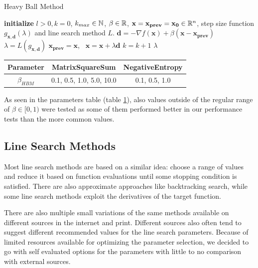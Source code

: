 \documentclass[a4paper,english,titlepage,12pt]{article}
\newcommand{\vect}[1]{\ensuremath{\mathbf{#1}}}
\newcommand{\norm}[1]{\ensuremath\Vert #1 \Vert}
\newcommand{\R}{\ensuremath\mathbb{R}}
\newcommand{\N}{\ensuremath\mathbb{N}}
\begin{document}
\begin{algorithm}[H]
\caption{Heavy Ball Method}
\label{alg_heavy_ball}
\begin{algorithmic}[1]
\STATE \textbf{initialize} $l > 0, k = 0$, $k_{max} \in \N$, $\beta \in \R$, $\vect{x} = \vect{x_{prev}} = \vect{x_0} \in \R^n$, step size function $g_{\vect{x}, \vect{d}}(\lambda)$ and line search method $L$.
\WHILE{$\norm{\nabla f(\vect{x})} > l$ \AND $k < k_{max}$}
    \STATE $\vect{d} = -\nabla f(\vect{x}) + \beta (\vect{x} - \vect{x_{prev}})$
    \STATE $\lambda = L(g_{\vect{x}, \vect{d}})$
    \STATE $\vect{x_{prev}} = \vect{x}$, \ $\vect{x} = \vect{x} + \lambda \vect{d}$
    \STATE $k = k + 1$
\ENDWHILE
\RETURN $\lambda$
\end{algorithmic}
\end{algorithm}

\begin{table}[H]
\label{tab:params_HeavyBallMethod}
\centering
{}
\begin{tabular}{|c|c|c|}
\hline
\rowcolor{gray!25}
Parameter & MatrixSquareSum & NegativeEntropy \\
\hline
$\beta_{HBM}$ & 0.1, 0.5, 1.0, 5.0, 10.0 & 0.1, 0.5, 1.0 \\
\hline
\end{tabular}
\end{table}

As seen in the parameters table (table \ref{tab:params_HeavyBallMethod}), also values outside of the regular range of $\beta \in [0, 1)$ were tested as some of them performed better in our performance tests than the more common values.


\subsection{Line Search Methods}
\label{sect:line_search_methods}

Most line search methods are based on a similar idea: choose a range of values and reduce it based on function evaluations until some stopping condition is satisfied. There are also approximate approaches like backtracking search, while some line search methods exploit the derivatives of the target function.

There are also multiple small variations of the same methods available on different sources in the internet and print. Different sources also often tend to suggest different recommended values for the line search parameters. Because of limited resources available for optimizing the parameter selection, we decided to go with self evaluated options for the parameters with little to no comparison with external sources. \cite{book:convex_optimization} \cite{book:nonlinear_programming} 
\end{document}
